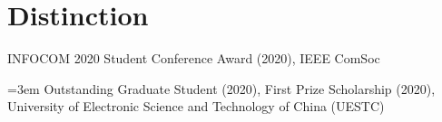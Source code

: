 \vspace{-8pt}
\section*{Distinction}
\vspace{-4pt}
\indent

INFOCOM 2020 Student Conference Award (2020), IEEE ComSoc

\hangindent=3em Outstanding Graduate Student (2020), First Prize Scholarship (2020), University of Electronic Science and Technology of China (UESTC)